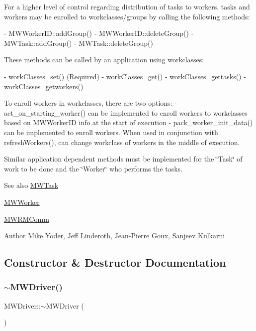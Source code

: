 \begin{DoxyVerb}For a higher level of control regarding distribution of tasks to workers, 
tasks and workers may be enrolled to workclasses/groups by calling the
following methods:

- MWWorkerID::addGroup()
- MWWorkerID::deleteGroup()
- MWTask::addGroup()
- MWTask::deleteGroup()

These methods can be called by an application using workclasses:

- workClasses_set()  (Required)
- workClasses_get()
- workClasses_gettasks()
- workClasses_getworkers()

To enroll workers in workclasses, there are two options:
- act_on_starting_worker() can be implemented to enroll workers to 
workclasses based on MWWorkerID info at the start of execution
- pack_worker_init_data() can be implemented to enroll workers. When used 
in conjunction with refreshWorkers(), can change workclass of workers in the        middle of execution.    
\end{DoxyVerb}


Similar application dependent methods must be implemented for the \char`\"{}\+Task\char`\"{} of work to be done and the \char`\"{}\+Worker\char`\"{} who performs the tasks.

\begin{DoxySeeAlso}{See also}
\hyperlink{classMWTask}{M\+W\+Task} 

\hyperlink{classMWWorker}{M\+W\+Worker} 

\hyperlink{classMWRMComm}{M\+W\+R\+M\+Comm} 
\end{DoxySeeAlso}
\begin{DoxyAuthor}{Author}
Mike Yoder, Jeff Linderoth, Jean-\/\+Pierre Goux, Sanjeev Kulkarni 
\end{DoxyAuthor}


\subsection{Constructor \& Destructor Documentation}
\mbox{\label{classMWDriver_a05b1dac7d50ff571c480ff386e6fcb30}} 
\subsubsection{\texorpdfstring{$\sim$\+M\+W\+Driver()}{~MWDriver()}}
{\footnotesize\ttfamily M\+W\+Driver\+::$\sim$\+M\+W\+Driver (\begin{DoxyParamCaption}{ }\end{DoxyParamCaption})\hspace{0.3cm}{\ttfamily [virtual]}}

